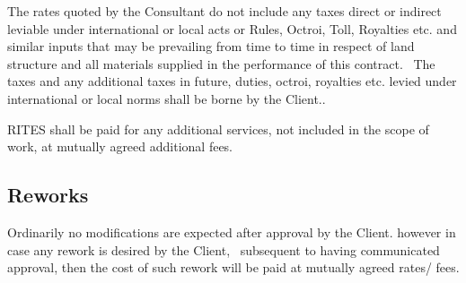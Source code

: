 The rates quoted by the Consultant do not include any taxes direct or indirect leviable under international or local
acts or Rules, Octroi, Toll, Royalties etc. and similar inputs that may be prevailing from time to time in respect of
land structure and all materials supplied in the performance of this contract. \ The taxes and any additional taxes in
future, duties, octroi, royalties etc. levied under international or local norms shall be borne by the Client..


RITES shall be paid for any additional services, not included in the scope of work, at mutually agreed additional fees.

\subsection[Reworks]{\bfseries Reworks}


Ordinarily no modifications are expected after approval by the Client. however in case any rework is desired by the
Client, \ subsequent to having communicated approval, then the cost of such rework will be paid at mutually agreed
rates/ fees.


